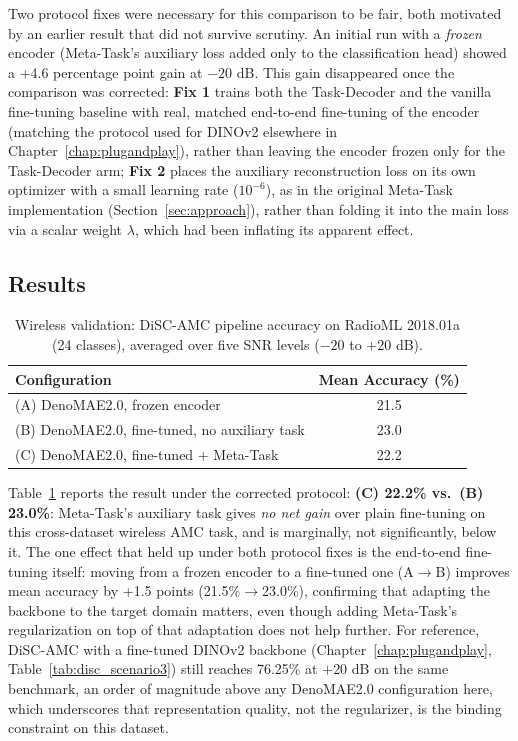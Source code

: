 Two protocol fixes were necessary for this comparison to be fair, both motivated by an earlier result that did not survive scrutiny. An initial run with a \emph{frozen} encoder (Meta-Task's auxiliary loss added only to the classification head) showed a +4.6 percentage point gain at $-20$ dB. This gain disappeared once the comparison was corrected: \textbf{Fix 1} trains both the Task-Decoder and the vanilla fine-tuning baseline with real, matched end-to-end fine-tuning of the encoder (matching the protocol used for DINOv2 elsewhere in Chapter~\ref{chap:plugandplay}), rather than leaving the encoder frozen only for the Task-Decoder arm; \textbf{Fix 2} places the auxiliary reconstruction loss on its own optimizer with a small learning rate ($10^{-6}$), as in the original Meta-Task implementation (Section~\ref{sec:approach}), rather than folding it into the main loss via a scalar weight $\lambda$, which had been inflating its apparent effect.

\subsection{Results}

\begin{table}[htbp]
\centering
\caption{Wireless validation: DiSC-AMC pipeline accuracy on RadioML 2018.01a (24 classes), averaged over five SNR levels ($-20$ to $+20$ dB).}
\label{tab:metatask_wireless}
\begin{tabular}{lc}
\toprule
Configuration & Mean Accuracy (\%) \\
\midrule
(A) DenoMAE2.0, frozen encoder & 21.5 \\
(B) DenoMAE2.0, fine-tuned, no auxiliary task & 23.0 \\
(C) DenoMAE2.0, fine-tuned + Meta-Task & 22.2 \\
\bottomrule
\end{tabular}
\end{table}

Table~\ref{tab:metatask_wireless} reports the result under the corrected protocol: \textbf{(C) 22.2\% vs.\ (B) 23.0\%}: Meta-Task's auxiliary task gives \emph{no net gain} over plain fine-tuning on this cross-dataset wireless AMC task, and is marginally, not significantly, below it. The one effect that held up under both protocol fixes is the end-to-end fine-tuning itself: moving from a frozen encoder to a fine-tuned one (A$\to$B) improves mean accuracy by +1.5 points (21.5\%$\to$23.0\%), confirming that adapting the backbone to the target domain matters, even though adding Meta-Task's regularization on top of that adaptation does not help further. For reference, DiSC-AMC with a fine-tuned DINOv2 backbone (Chapter~\ref{chap:plugandplay}, Table~\ref{tab:disc_scenario3}) still reaches 76.25\% at $+20$ dB on the same benchmark, an order of magnitude above any DenoMAE2.0 configuration here, which underscores that representation quality, not the regularizer, is the binding constraint on this dataset.

